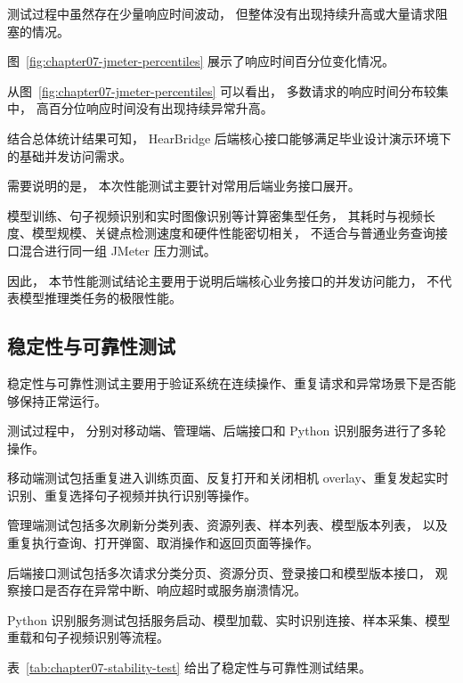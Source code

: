 测试过程中虽然存在少量响应时间波动，
但整体没有出现持续升高或大量请求阻塞的情况。

图~\ref{fig:chapter07-jmeter-percentiles} 展示了响应时间百分位变化情况。


从图~\ref{fig:chapter07-jmeter-percentiles} 可以看出，
多数请求的响应时间分布较集中，
高百分位响应时间没有出现持续异常升高。

结合总体统计结果可知，
HearBridge 后端核心接口能够满足毕业设计演示环境下的基础并发访问需求。

需要说明的是，
本次性能测试主要针对常用后端业务接口展开。

模型训练、句子视频识别和实时图像识别等计算密集型任务，
其耗时与视频长度、模型规模、关键点检测速度和硬件性能密切相关，
不适合与普通业务查询接口混合进行同一组 JMeter 压力测试。

因此，
本节性能测试结论主要用于说明后端核心业务接口的并发访问能力，
不代表模型推理类任务的极限性能。

\subsection{稳定性与可靠性测试}

稳定性与可靠性测试主要用于验证系统在连续操作、重复请求和异常场景下是否能够保持正常运行。

测试过程中，
分别对移动端、管理端、后端接口和 Python 识别服务进行了多轮操作。

移动端测试包括重复进入训练页面、反复打开和关闭相机 overlay、重复发起实时识别、重复选择句子视频并执行识别等操作。

管理端测试包括多次刷新分类列表、资源列表、样本列表、模型版本列表，
以及重复执行查询、打开弹窗、取消操作和返回页面等操作。

后端接口测试包括多次请求分类分页、资源分页、登录接口和模型版本接口，
观察接口是否存在异常中断、响应超时或服务崩溃情况。

Python 识别服务测试包括服务启动、模型加载、实时识别连接、样本采集、模型重载和句子视频识别等流程。

表~\ref{tab:chapter07-stability-test} 给出了稳定性与可靠性测试结果。

